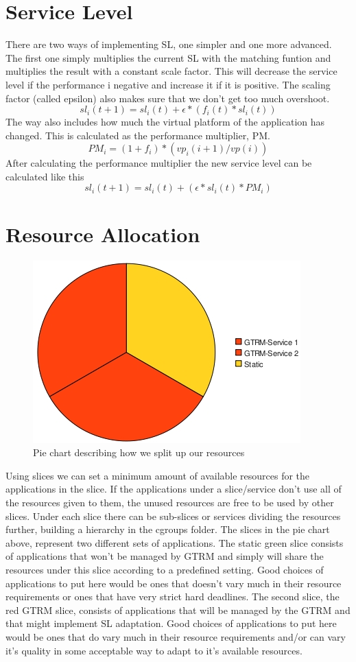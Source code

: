 \documentclass[nobiblatex]{LTHthesis}
\begin{document}
\section{Service Level}
There are two ways of implementing SL, one simpler and one more advanced. The first one simply multiplies the current SL with the matching funtion and multiplies the result with a constant scale factor. This will decrease the service level if the performance i negative and increase it if it is positive. The scaling factor (called epsilon) also makes sure that we don't get too much overshoot. 
\[sl_i(t+1)= sl_i(t) + \epsilon*(f_i(t)*sl_i(t)) \]
The way also includes how much the virtual platform of the application has changed. This is calculated as the performance multiplier, PM.
\[PM_i = (1+f_i)*(vp_i(i+1)/vp(i))\]
After calculating the performance multiplier the new service level can be calculated like this
\[sl_i(t+1)=sl_i(t) + (\epsilon*sl_i(t)*PM_i)\]
\section{Resource Allocation}
\begin{figure}
    \centering
    \includegraphics{piechart.jpeg}
    \caption{Pie chart describing how we split up our resources}
    \label{fig:Piechart}
\end{figure}
Using slices we can set a minimum amount of available resources for the applications in the slice. If the applications under a slice/service don’t use all of the resources given to them, the unused resources are free to be used by other slices. Under each slice there can be sub-slices or services dividing the resources further, building a hierarchy in the cgroups folder. The slices in the pie chart above, represent two different sets of applications. The static green slice consists of applications that won’t be managed by GTRM and simply will share the resources under this slice according to a predefined setting. Good choices of applications to put here would be ones that doesn’t vary much in their resource requirements or ones that have very strict hard deadlines. The second slice, the red GTRM slice, consists of applications that will be managed by the GTRM and that might implement SL adaptation. Good choices of applications to put here would be ones that do vary much in their resource requirements and/or can vary it’s quality in some acceptable way to adapt to it’s available resources.
\end{document}

